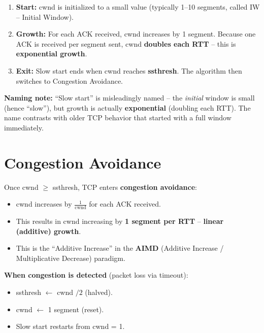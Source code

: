 \documentclass[11pt, letterpaper]{article}
\begin{document}
\begin{enumerate}[noitemsep]
  \item \textbf{Start:} cwnd is initialized to a small value (typically 1--10 segments, called IW -- Initial Window).
  \item \textbf{Growth:} For each ACK received, cwnd increases by 1 segment. Because one ACK is received per segment sent, cwnd \textbf{doubles each RTT} -- this is \textbf{exponential growth}.
  \item \textbf{Exit:} Slow start ends when cwnd reaches \textbf{ssthresh}. The algorithm then switches to Congestion Avoidance.
\end{enumerate}

\begin{tcolorbox}[colback=part4bg, colframe=sectionorange, arc=3pt, boxrule=1pt]
\textbf{Naming note:} ``Slow start'' is misleadingly named -- the \emph{initial} window is small (hence ``slow''), but growth is actually \textbf{exponential} (doubling each RTT). The name contrasts with older TCP behavior that started with a full window immediately.
\end{tcolorbox}

\section*{Congestion Avoidance}

Once cwnd $\geq$ ssthresh, TCP enters \textbf{congestion avoidance}:

\begin{itemize}[noitemsep]
  \item cwnd increases by $\frac{1}{\text{cwnd}}$ for each ACK received.
  \item This results in cwnd increasing by \textbf{1 segment per RTT} -- \textbf{linear (additive) growth}.
  \item This is the ``Additive Increase'' in the \textbf{AIMD} (Additive Increase / Multiplicative Decrease) paradigm.
\end{itemize}

\textbf{When congestion is detected} (packet loss via timeout):
\begin{itemize}[noitemsep]
  \item ssthresh $\leftarrow$ cwnd $/ 2$ (halved).
  \item cwnd $\leftarrow$ 1 segment (reset).
  \item Slow start restarts from cwnd = 1.
\end{itemize}
\end{document}
